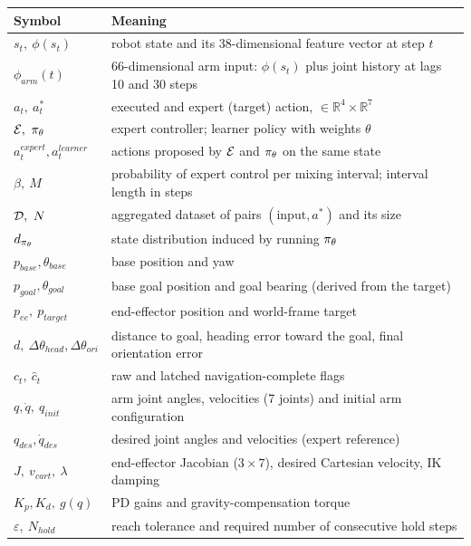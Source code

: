 \begin{center}
\small
\renewcommand{\arraystretch}{1.12}
\begin{tabular}{@{}p{3.3cm}p{9.4cm}@{}}
\toprule
\textbf{Symbol} & \textbf{Meaning}\\
\midrule
$s_t,\ \phi(s_t)$ & robot state and its 38-dimensional feature vector at step $t$\\
$\phi_{arm}(t)$ & 66-dimensional arm input: $\phi(s_t)$ plus joint history at lags 10 and 30 steps\\
$a_t,\ a_t^{*}$ & executed and expert (target) action, $\in\mathbb{R}^4\times\mathbb{R}^7$\\
$\dagE,\ \dagPi$ & expert controller; learner policy with weights $\theta$\\
$a_t^{expert},a_t^{learner}$ & actions proposed by $\mathcal{E}$ and $\pi_\theta$ on the same state\\
$\beta,\ M$ & probability of expert control per mixing interval; interval length in steps\\
$\dagD,\ N$ & aggregated dataset of pairs $(\text{input},a^{*})$ and its size\\
$d_{\pi_\theta}$ & state distribution induced by running $\pi_\theta$\\
$p_{base},\theta_{base}$ & base position and yaw\\
$p_{goal},\theta_{goal}$ & base goal position and goal bearing (derived from the target)\\
$p_{ee},\ p_{target}$ & end-effector position and world-frame target\\
$d,\ \Delta\theta_{head},\Delta\theta_{ori}$ & distance to goal, heading error toward the goal, final orientation error\\
$c_t,\ \hat c_t$ & raw and latched navigation-complete flags\\
$q,\dot q,\ q_{init}$ & arm joint angles, velocities (7 joints) and initial arm configuration\\
$q_{des},\dot q_{des}$ & desired joint angles and velocities (expert reference)\\
$J,\ v_{cart},\ \lambda$ & end-effector Jacobian ($3\times7$), desired Cartesian velocity, IK damping\\
$K_p,K_d,\ g(q)$ & PD gains and gravity-compensation torque\\
$\varepsilon,\ N_{hold}$ & reach tolerance and required number of consecutive hold steps\\
\bottomrule
\end{tabular}
\end{center}

